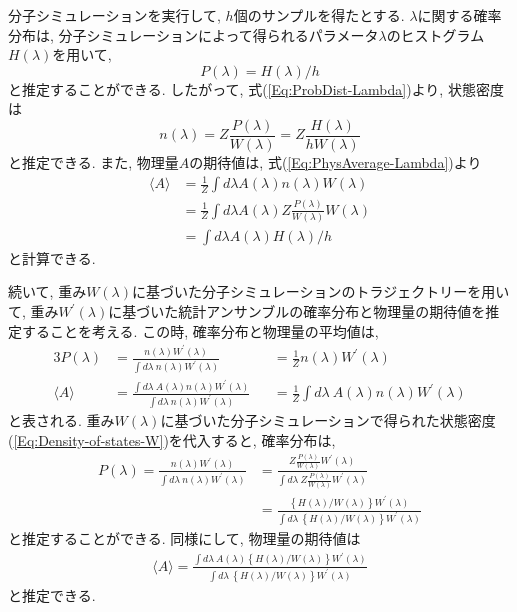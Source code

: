 分子シミュレーションを実行して, $h$個のサンプルを得たとする. 
$\lambda$に関する確率分布は, 分子シミュレーションによって得られるパラメータ$\lambda$のヒストグラム$H(\lambda)$を用いて, 
\begin{equation}
    P(\lambda) = H(\lambda) / h
\end{equation}
と推定することができる. したがって, 式(\ref{Eq:ProbDist-Lambda})より, 状態密度は
\begin{equation}
    n(\lambda) = Z \frac{P(\lambda)}{W(\lambda)} = Z \frac{H(\lambda)}{h W(\lambda)}
    \label{Eq:Density-of-states-W}
\end{equation}
と推定できる. また, 物理量$A$の期待値は, 式(\ref{Eq:PhysAverage-Lambda})より
\begin{align}
    \langle A \rangle &=
    \frac{1}{Z} \int d\lambda A(\lambda) n(\lambda) W(\lambda) \\ &=
    \frac{1}{Z} \int d\lambda A(\lambda) Z \frac{P(\lambda)}{W(\lambda)} W(\lambda) \\ &=
    \int d\lambda A(\lambda) H(\lambda)/h
\end{align}
と計算できる. 

続いて, 重み$W(\lambda)$に基づいた分子シミュレーションのトラジェクトリーを用いて, 重み$W^{\prime}(\lambda)$に基づいた統計アンサンブルの確率分布と物理量の期待値を推定することを考える. 
この時, 確率分布と物理量の平均値は, 
\begin{alignat}{3}
    P(\lambda) &=
    \frac{n(\lambda)W^{\prime}(\lambda)}{\int d\lambda~ n(\lambda) W^{\prime}(\lambda)} &&=
    \frac{1}{Z} n(\lambda)W^{\prime}(\lambda)
    \label{Eq:ProbDist-Lambda-Prime}
    \\
    \langle A \rangle &=
    \frac{\int d\lambda~ A(\lambda)n(\lambda)W^{\prime}(\lambda)}{\int d\lambda~ n(\lambda) W^{\prime}(\lambda)} &&=
    \frac{1}{Z} \int d\lambda~ A(\lambda)n(\lambda)W^{\prime}(\lambda)
    \label{Eq:PhysAverage-Lambda-Prime}
\end{alignat}
と表される. 重み$W(\lambda)$に基づいた分子シミュレーションで得られた状態密度(\ref{Eq:Density-of-states-W})を代入すると, 
確率分布は, 
\begin{align}
    P(\lambda) =
    \frac{n(\lambda) W^{\prime}(\lambda)}{\int d\lambda~ n(\lambda) W^{\prime}(\lambda)} &=
    \frac{Z \frac{P(\lambda)}{W(\lambda)} W^{\prime}(\lambda)}{\int d\lambda~ Z \frac{P(\lambda)}{W(\lambda)} W^{\prime}(\lambda)} \\ &=
    \frac{\left\{H(\lambda)/W(\lambda)\right\} W^{\prime}(\lambda)}{\int d\lambda~ \left\{H(\lambda)/W(\lambda)\right\} W^{\prime}(\lambda)}
\end{align}
と推定することができる. 同様にして, 物理量の期待値は
\begin{align}
    \langle A \rangle  =
    \frac{\int d\lambda~ A(\lambda)\left\{H(\lambda)/W(\lambda)\right\} W^{\prime}(\lambda)}{\int d\lambda~ \left\{H(\lambda)/W(\lambda)\right\} W^{\prime}(\lambda)}
\end{align}
と推定できる. 

